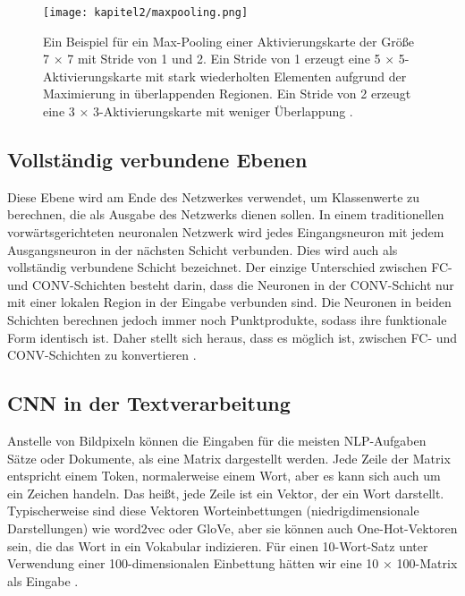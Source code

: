 \begin{figure}[H]
    \centering
    \texttt{[image: kapitel2/maxpooling.png]}
    \caption[Max-Pooling]{Ein Beispiel für ein Max-Pooling einer Aktivierungskarte der Größe 7 × 7 mit Stride von 1 und 2. Ein Stride von 1 erzeugt eine 5 × 5-Aktivierungskarte mit stark wiederholten Elementen aufgrund der Maximierung in überlappenden Regionen. Ein Stride von 2 erzeugt eine 3 × 3-Aktivierungskarte mit weniger Überlappung \cite*[326]{Aggarwal2018}.}
    \label{Kap2:Pooling}
\end{figure}


\subsection{Vollständig verbundene Ebenen}
Diese Ebene wird am Ende des Netzwerkes verwendet, um Klassenwerte zu berechnen, die als Ausgabe des Netzwerks dienen sollen. In einem traditionellen vorwärtsgerichteten neuronalen Netzwerk wird jedes Eingangsneuron mit jedem Ausgangsneuron in der nächsten Schicht verbunden. Dies wird auch als vollständig verbundene Schicht bezeichnet. Der einzige Unterschied zwischen FC- und CONV-Schichten besteht darin, dass die Neuronen in der CONV-Schicht nur mit einer lokalen Region in der Eingabe verbunden sind. Die Neuronen in beiden Schichten berechnen jedoch immer noch Punktprodukte, sodass ihre funktionale Form identisch ist. Daher stellt sich heraus, dass es möglich ist, zwischen FC- und CONV-Schichten zu konvertieren \cite*{StanfordUniversityCoursecs231n2018a}.

\subsection{CNN in der Textverarbeitung}
Anstelle von Bildpixeln können die Eingaben für die meisten NLP-Aufgaben Sätze oder Dokumente, als eine Matrix dargestellt werden. Jede Zeile der Matrix entspricht einem Token, normalerweise einem Wort, aber es kann sich auch um ein Zeichen handeln. Das heißt, jede Zeile ist ein Vektor, der ein Wort darstellt. Typischerweise sind diese Vektoren Worteinbettungen (niedrigdimensionale Darstellungen) wie word2vec oder GloVe, aber sie können auch One-Hot-Vektoren sein, die das Wort in ein Vokabular indizieren. Für einen 10-Wort-Satz unter Verwendung einer 100-dimensionalen Einbettung hätten wir eine 10 × 100-Matrix als Eingabe \cite*{Zhang}.

